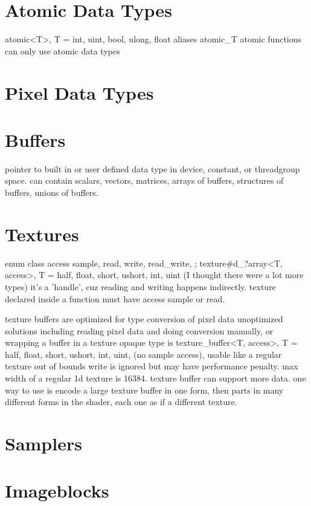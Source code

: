 \section{Atomic Data Types}

atomic<T>, T = int, uint, bool, ulong, float
aliases atomic_T
atomic functions can only use atomic data types

\section{Pixel Data Types}


\section{Buffers}

pointer to built in or user defined data type in device, constant, or threadgroup space.
can contain scalars, vectors, matrices, arrays of buffers, structures of buffers, unions of buffers.

\section{Textures}

enum class access { sample, read, write, read_write, };
texture#d_?array<T, access>, T = half, float, short, ushort, int, uint (I thought there were a lot more types)
it's a 'handle', cuz reading and writing happens indirectly.
texture declared inside a function must have access sample or read.

texture buffers are optimized for type conversion of pixel data
    unoptimized solutions including reading pixel data and doing conversion manually, or wrapping a buffer in a texture
opaque type is texture_buffer<T, access>, T = half, float, short, ushort, int, uint, (no sample access), usable like a regular texture
out of bounds write is ignored but may have performance penalty.
max width of a regular 1d texture is 16384. texture buffer can support more data.
one way to use is encode a large texture buffer in one form, then parts in many different forms in the shader, each one as if a different texture. 

\section{Samplers}
\section{Imageblocks}

